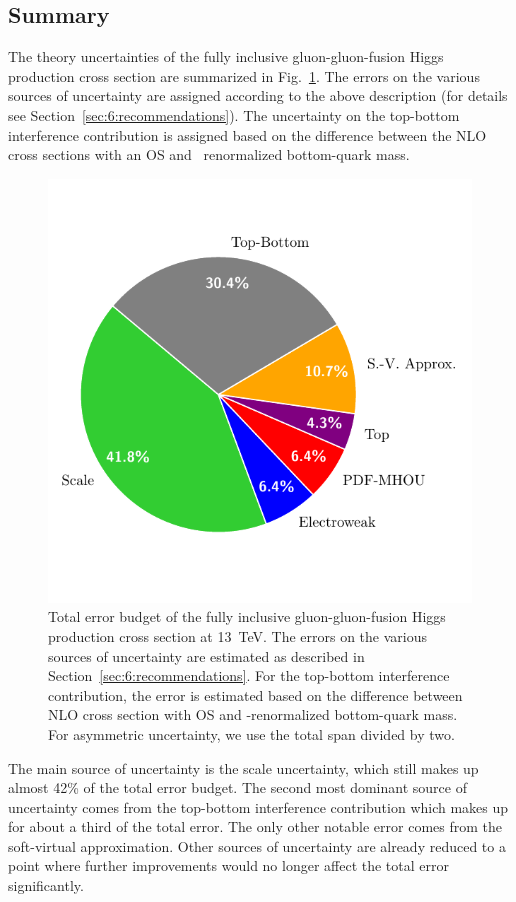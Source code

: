 \subsection{Summary}
The theory uncertainties of the fully inclusive gluon-gluon-fusion Higgs production cross section are summarized in Fig.~\ref{fig:4:error_budget}. The errors on the various sources of uncertainty are assigned according to the above description (for details see Section~\ref{sec:6:recommendations}). The uncertainty on the top-bottom interference contribution is assigned based on the difference between the \acs{NLO} cross sections with an \acs{OS} and \MS\ renormalized bottom-quark mass.
\begin{figure}[ht]
\centering
\includegraphics[scale=0.8]{Images/error_budget_before.pdf}
\caption{Total error budget of the fully inclusive gluon-gluon-fusion Higgs production cross section at 13\ TeV. The errors on the various sources of uncertainty are estimated as described in Section~\ref{sec:6:recommendations}. For the top-bottom interference contribution, the error is estimated based on the difference between \acs{NLO} cross section with \acs{OS} and \MS-renormalized bottom-quark mass. For asymmetric uncertainty, we use the total span divided by two.}
\label{fig:4:error_budget}
\end{figure}
The main source of uncertainty is the scale uncertainty, which still makes up almost 42\% of the total error budget. The second most dominant source of uncertainty comes from the top-bottom interference contribution which makes up for about a third of the total error. The only other notable error comes from the soft-virtual approximation. Other sources of uncertainty are already reduced to a point where further improvements would no longer affect the total error significantly.

